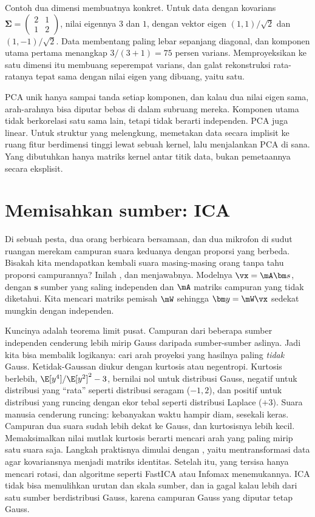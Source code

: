 Contoh dua dimensi membuatnya konkret. Untuk data dengan kovarians
$\bm\Sigma=\begin{pmatrix}2&1\\1&2\end{pmatrix}$, nilai eigennya $3$ dan $1$, dengan vektor eigen $(1,1)/\sqrt2$ dan
$(1,-1)/\sqrt2$. Data membentang paling lebar sepanjang diagonal, dan komponen utama pertama menangkap $3/(3+1)=75$
persen varians. Memproyeksikan ke satu dimensi itu membuang seperempat varians, dan galat rekonstruksi rata-ratanya
tepat sama dengan nilai eigen yang dibuang, yaitu satu.

PCA unik hanya sampai tanda setiap komponen, dan kalau dua nilai eigen sama, arah-arahnya bisa
diputar bebas di dalam subruang mereka. Komponen utama tidak berkorelasi satu sama lain, tetapi
tidak berarti independen. PCA juga linear. Untuk struktur yang melengkung, 
\citep{scholkopf1998} memetakan data secara implisit ke ruang fitur berdimensi tinggi lewat sebuah
kernel, lalu menjalankan PCA di sana. Yang dibutuhkan hanya matriks kernel antar titik data, bukan
pemetaannya secara eksplisit.

\section{Memisahkan sumber: ICA}

Di sebuah pesta, dua orang berbicara bersamaan, dan dua mikrofon di sudut ruangan merekam
campuran suara keduanya dengan proporsi yang berbeda. Bisakah kita mendapatkan kembali suara
masing-masing orang tanpa tahu proporsi campurannya? Inilah , dan
 \citep{hyvarinen2000} menjawabnya. Modelnya
$\vx=\mA\bm s$, dengan $\bm s$ sumber yang saling independen dan $\mA$ matriks campuran yang tidak
diketahui. Kita mencari matriks pemisah $\mW$ sehingga $\bm y=\mW\vx$ sedekat mungkin dengan
independen.

Kuncinya adalah teorema limit pusat. Campuran dari beberapa sumber independen cenderung lebih
mirip Gauss daripada sumber-sumber aslinya. Jadi kita bisa membalik logikanya: cari arah proyeksi
yang hasilnya paling \emph{tidak} Gauss. Ketidak-Gaussan diukur dengan kurtosis atau negentropi. Kurtosis berlebih, $\E[y^4]/\E[y^2]^2-3$,
bernilai nol untuk distribusi Gauss, negatif untuk distribusi yang ``rata'' seperti distribusi seragam ($-1{,}2$), dan
positif untuk distribusi yang runcing dengan ekor tebal seperti distribusi Laplace ($+3$). Suara manusia cenderung
runcing: kebanyakan waktu hampir diam, sesekali keras. Campuran dua suara sudah lebih dekat ke Gauss, dan kurtosisnya
lebih kecil. Memaksimalkan nilai mutlak kurtosis berarti mencari arah yang paling mirip satu suara saja.
Langkah praktisnya dimulai dengan , yaitu mentransformasi data agar
kovariansnya menjadi matriks identitas. Setelah itu, yang tersisa hanya mencari rotasi, dan
algoritme seperti FastICA atau Infomax menemukannya. ICA tidak bisa memulihkan urutan dan skala
sumber, dan ia gagal kalau lebih dari satu sumber berdistribusi Gauss, karena campuran Gauss
yang diputar tetap Gauss.

